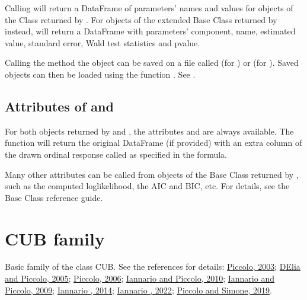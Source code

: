 \documentclass[letterpaper,10pt,english]{sphinxmanual}
\begin{document}
\sphinxAtStartPar
Calling  will return a DataFrame of parameters’ names and values for objects
of the Class  returned by . For objects of the extended Base Class  returned
by  instead, will return a DataFrame with parameters’ component, name, estimated value,
standard error, Wald test statistics and p\sphinxhyphen{}value.

\sphinxAtStartPar
Calling the method  the object can be saved on a file called 
(for ) or  (for ).
Saved objects can then be loaded using the function .
See {\hyperref[\detokenize{manual:save-load-example}]{}}.


\subsection{Attributes of  and }
\label{\detokenize{manual:attributes-of-estimate-and-draw}}
\sphinxAtStartPar
For both objects returned by  and , the attributes  and
 are always available. The function  will return the original DataFrame (if provided)
with an extra column of the drawn ordinal response called as specified in the formula.

\sphinxAtStartPar
Many other attributes can be called from objects of the Base Class  returned by
, such as the computed loglikelihood, the AIC and BIC, etc. For details,
see  the Base Class  reference guide.


\section{CUB family}
\label{\detokenize{manual:cub-family}}
\sphinxAtStartPar
Basic family of the class CUB. See the references for details:
\hyperlink{cite.references:id4}{Piccolo, 2003}; \hyperlink{cite.references:id5}{D\textquotesingle{}Elia and Piccolo, 2005}; \hyperlink{cite.references:id7}{Piccolo, 2006};
\hyperlink{cite.references:id8}{Iannario and Piccolo, 2010}; \hyperlink{cite.references:id20}{Iannario and Piccolo, 2009}; \hyperlink{cite.references:id21}{Iannario , 2014};
\hyperlink{cite.references:id22}{Iannario , 2022}; \hyperlink{cite.references:id3}{Piccolo and Simone, 2019}.
\end{document}
